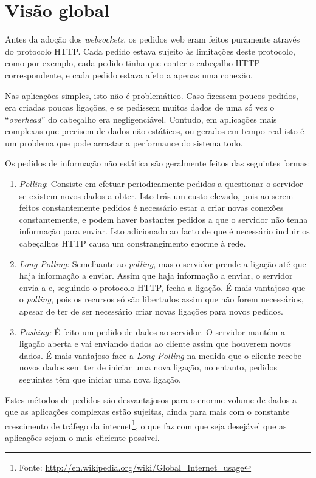 \documentclass[a4paper]{article}
\begin{document}
\section{Visão global}

Antes da adoção dos \emph{websockets}, os pedidos web eram feitos puramente através do protocolo HTTP. Cada pedido estava sujeito às limitações deste protocolo, como por exemplo, cada pedido tinha que conter o cabeçalho HTTP correspondente, e cada pedido estava afeto a apenas uma conexão.

Nas aplicações simples, isto não é problemático. Caso fizessem poucos pedidos, era criadas poucas ligações, e se pedissem muitos dados de uma só vez o "`\emph{overhead}"' do cabeçalho era negligenciável. Contudo, em aplicações mais complexas que precisem de dados não estáticos, ou gerados em tempo real isto é um problema que pode arrastar a performance do sistema todo.

Os pedidos de informação não estática são geralmente feitos das seguintes formas:
\begin{enumerate}
	\item{\emph{Polling}:} Consiste em efetuar periodicamente pedidos a questionar o servidor se existem novos dados a obter. Isto trás um custo elevado, pois ao serem feitos constantemente pedidos é necessário estar a criar novas conexões constantemente, e podem haver bastantes pedidos a que o servidor não tenha informação para enviar. Isto adicionado ao facto de que é necessário incluir os cabeçalhos HTTP causa um constrangimento enorme à rede.
	\item{\emph{Long-Polling:}} Semelhante ao \emph{polling}, mas o servidor prende a ligação até que haja informação a enviar. Assim que haja informação a enviar, o servidor envia-a e, seguindo o protocolo HTTP, fecha a ligação. É mais vantajoso que o \emph{polling}, pois os recursos só são libertados assim que não forem necessários, apesar de ter de ser necessário criar novas ligações para novos pedidos.
	\item{\emph{Pushing:}}  É feito um pedido de dados ao servidor. O servidor mantém a ligação aberta e vai enviando dados ao cliente assim que houverem novos dados. É mais vantajoso face a \emph{Long-Polling} na medida que o cliente recebe novos dados sem ter de iniciar uma nova ligação, no entanto, pedidos seguintes têm que iniciar uma nova ligação.
\end{enumerate}

Estes métodos de pedidos são desvantajosos para o enorme volume de dados a que as aplicações complexas estão sujeitas, ainda para mais com o constante crescimento de tráfego da internet\footnote{Fonte: \url{http://en.wikipedia.org/wiki/Global_Internet_usage}}, o que faz com que seja desejável que as aplicações sejam o mais eficiente possível.
\end{document}
